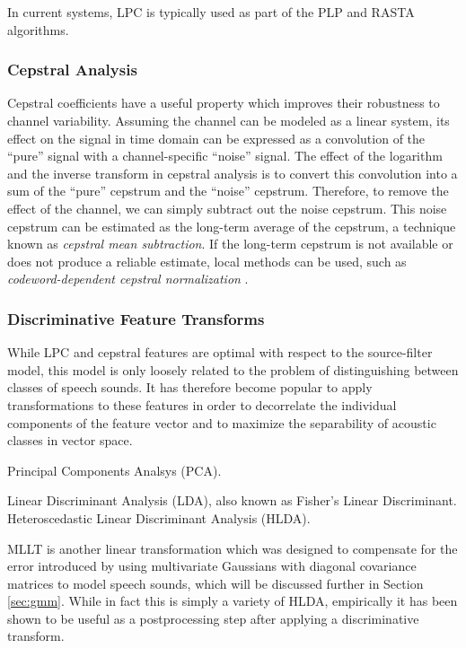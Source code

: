 \documentclass{article}
\begin{document}
In current systems, LPC is typically used as part of the PLP
\cite{hermansky1990} and RASTA \cite{hermansky1994} algorithms.

\subsubsection{Cepstral Analysis}
\label{sec:ceps}

Cepstral coefficients have a useful property which improves their
robustness to channel variability.  Assuming the channel can be
modeled as a linear system, its effect on the signal in time domain
can be expressed as a convolution of the ``pure'' signal with a
channel-specific ``noise'' signal.  The effect of the logarithm and
the inverse transform in cepstral analysis is to convert this
convolution into a sum of the ``pure'' cepstrum and the ``noise''
cepstrum.  Therefore, to remove the effect of the channel, we can
simply subtract out the noise cepstrum.  This noise cepstrum can be
estimated as the long-term average of the cepstrum, a technique known
as {\em cepstral mean subtraction}.  If the long-term cepstrum is not
available or does not produce a reliable estimate, local methods can
be used, such as {\em codeword-dependent cepstral normalization}
\cite{acero1990}.

\subsubsection{Discriminative Feature Transforms}
\label{sec:lda}

While LPC and cepstral features are optimal with respect to the
source-filter model, this model is only loosely related to the problem
of distinguishing between classes of speech sounds.  It has therefore
become popular to apply transformations to these features in order to
decorrelate the individual components of the feature vector and to
maximize the separability of acoustic classes in vector space.

Principal Components Analsys (PCA).

Linear Discriminant Analysis (LDA), also known as Fisher's Linear
Discriminant.  Heteroscedastic Linear Discriminant Analysis (HLDA).

MLLT \cite{gopinath1998} is another linear transformation which was
designed to compensate for the error introduced by using multivariate
Gaussians with diagonal covariance matrices to model speech sounds,
which will be discussed further in Section \ref{sec:gmm}.  While in
fact this is simply a variety of HLDA, empirically it has been shown
to be useful as a postprocessing step after applying a discriminative
transform.
\end{document}
